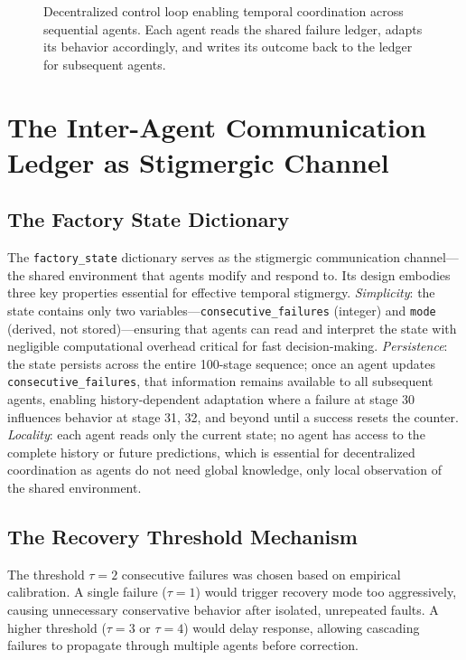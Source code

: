 \documentclass[12pt,a4paper,oneside]{report}
\begin{document}
\begin{figure}[H]
    \centering
    \caption{Decentralized control loop enabling temporal coordination across sequential agents. Each agent reads the shared failure ledger, adapts its behavior accordingly, and writes its outcome back to the ledger for subsequent agents.}
    \label{fig:swarm_control_loop}
\end{figure}

\section{The Inter-Agent Communication Ledger as Stigmergic Channel}

\subsection{The Factory State Dictionary}
\label{subsec:the_factory_state_dictionary}

The \texttt{factory\_state} dictionary serves as the stigmergic communication channel—the shared environment that agents modify and respond to. Its design embodies three key properties essential for effective temporal stigmergy. \textit{Simplicity}: the state contains only two variables—\texttt{consecutive\_failures} (integer) and \texttt{mode} (derived, not stored)—ensuring that agents can read and interpret the state with negligible computational overhead critical for fast decision-making. \textit{Persistence}: the state persists across the entire 100-stage sequence; once an agent updates \texttt{consecutive\_failures}, that information remains available to all subsequent agents, enabling history-dependent adaptation where a failure at stage 30 influences behavior at stage 31, 32, and beyond until a success resets the counter. \textit{Locality}: each agent reads only the current state; no agent has access to the complete history or future predictions, which is essential for decentralized coordination as agents do not need global knowledge, only local observation of the shared environment.

\subsection{The Recovery Threshold Mechanism}
\label{subsec:the_recovery_threshold_mechanism}

The threshold $\tau = 2$ consecutive failures was chosen based on empirical calibration. A single failure ($\tau = 1$) would trigger recovery mode too aggressively, causing unnecessary conservative behavior after isolated, unrepeated faults. A higher threshold ($\tau = 3$ or $\tau = 4$) would delay response, allowing cascading failures to propagate through multiple agents before correction.
\end{document}
